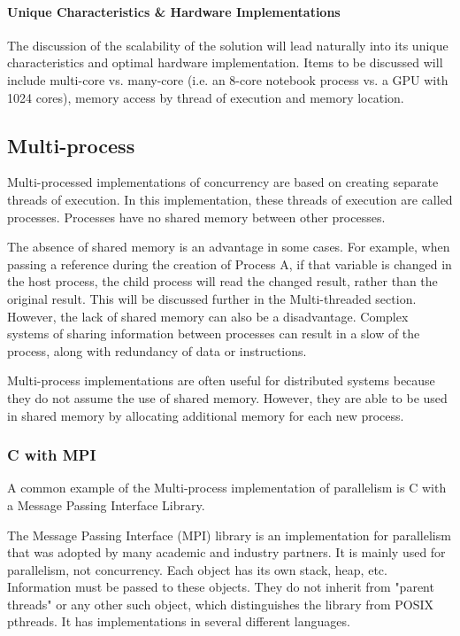 \documentclass[12pt]{article}
\begin{document}
\paragraph{Unique Characteristics \& Hardware Implementations}

The discussion of the scalability of the solution will lead naturally into its unique characteristics and optimal hardware implementation. Items to be discussed will include multi-core vs. many-core (i.e. an 8-core notebook process vs. a GPU with 1024 cores), memory access by thread of execution and memory location.

\subsection{Multi-process}
Multi-processed implementations of concurrency are based on creating separate threads of execution. In this implementation, these threads of execution are called processes. Processes have no shared memory between other processes.

The absence of shared memory is an advantage in some cases. For example, when passing a reference during the creation of Process A, if that variable is changed in the host process, the child process will read the changed result, rather than the original result. This will be discussed further in the Multi-threaded section.
However, the lack of shared memory can also be a disadvantage. Complex systems of sharing information between processes can result in a slow of the process, along with redundancy of data or instructions.

Multi-process implementations are often useful for distributed systems because they do not assume the use of shared memory. However, they are able to be used in shared memory by allocating additional memory for each new process.

\subsubsection{C with MPI}
A common example of the Multi-process implementation of parallelism is C with a Message Passing Interface Library.

The Message Passing Interface (MPI) library is an implementation for parallelism that was adopted by many academic and industry partners. It is mainly used for parallelism, not concurrency. Each object has its own stack, heap, etc. Information must be passed to these objects. They do not inherit from "parent threads" or any other such object, which distinguishes the library from POSIX pthreads. It has implementations in several different languages.
\cite{mpi_intro}
\end{document}
